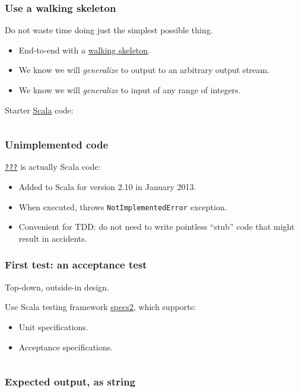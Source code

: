 \begin{frame}[fragile]
  \frametitle{Use a walking skeleton}

  Do not waste time doing just the simplest possible thing.

  \begin{itemize}
  \item End-to-end with a \href{http://blog.codeclimate.com/blog/2014/03/20/kickstart-your-next-project-with-a-walking-skeleton/}{walking skeleton}.
  \item We know we will \emph{generalize} to output to an arbitrary output stream.
  \item We know we will \emph{generalize} to input of any range of integers.
  \end{itemize}

  Starter \href{http://www.scala-lang.org/}{Scala} code:
  \inputminted{scala}{Main1.scala}
\end{frame}

\begin{frame}[fragile]
  \frametitle{Unimplemented code}

  \href{http://www.scala-lang.org/api/2.11.0/index.html\#scala.Predef$}{\texttt{???}} is actually Scala code:
  \begin{itemize}
  \item Added to Scala for version 2.10 in January 2013.
  \item When executed, throws \texttt{NotImplementedError} exception.
  \item Convenient for TDD: do not need to write pointless ``stub'' code that might result in accidents.
  \end{itemize}

\end{frame}

\begin{frame}[fragile]
  \frametitle{First test: an acceptance test}

  Top-down, outside-in design.

  Use Scala testing framework \href{http://specs2.org/}{specs2}, which supports:
  \begin{itemize}
  \item Unit specifications.
  \item Acceptance specifications.
  \end{itemize}

  \inputminted{scala}{MainSpec1.scala}
\end{frame}

\begin{frame}[fragile]
  \frametitle{Expected output, as string}

  \inputminted{scala}{MainSpec2.scala}
\end{frame}

